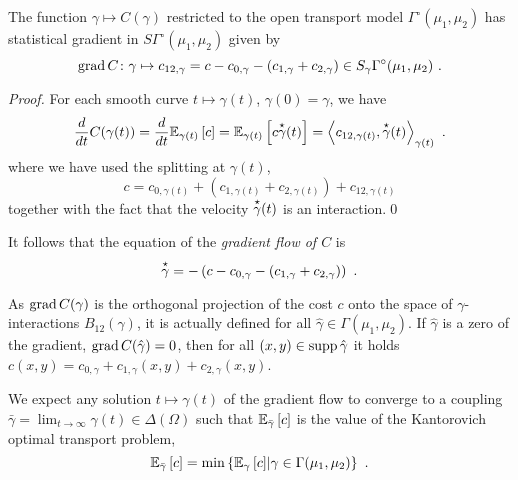 \documentclass[runningheads]{llncs}
\begin{document}
\begin{proposition}The function $\gamma \mapsto C(\gamma)$ restricted to the open transport model $\Gamma^\circ(\mu_1,\mu_2)$ has statistical gradient in $S\Gamma^\circ(\mu_1,\mu_2)$ given by
%
\begin{equation}\label{eq:gradient}
 \grad C \colon \gamma \mapsto c_{12,\gamma} = c - c_{0,\gamma} - (c_{1,\gamma} + c_{2,\gamma}) \in S_\gamma\Gamma^\circ(\mu_1,\mu_2)  \ . 
\end{equation}
\end{proposition}

\begin{proof}
For each smooth curve $t \mapsto \gamma(t)$, $\gamma(0) = \gamma$, we have 
\begin{equation*}
  \derivby t C(\gamma(t)) = \derivby t \expectat {\gamma(t)} c = \expectat {\gamma(t)} {c \velocity \gamma (t)} = \scalarat {\gamma(t)} {c_{12,\gamma(t)}} {\velocity \gamma(t)} \ .
\end{equation*}
where we have used the splitting at $\gamma(t)$,
\begin{equation*}
  c = c_{0,\gamma(t)} + (c_{1,\gamma(t)} + c_{2,\gamma(t)}) + c_{12,\gamma(t)}
\end{equation*}
together with the fact that the velocity $\overset{\star}{\gamma}(t)$ is an interaction.\qed \end{proof}

It follows that the equation of the \emph{gradient flow of $C$} is
%
\begin{equation*}
  \overset{\star}{\gamma} = - \left(c - c_{0,\gamma} - (c_{1,\gamma} + c_{2,\gamma})\right) \ .
\end{equation*}

\begin{remark}
As $\operatorname{grad} C(\gamma)$ is the orthogonal projection of the cost $c$ onto the space of $\gamma$-interactions $B_{12}(\gamma)$, it is actually defined for all $\hat \gamma \in \Gamma(\mu_1,\mu_2)$. If $\hat \gamma$ is a zero of the gradient,
$\operatorname{grad} C(\hat \gamma) = 0$, then for all $(x,y) \in \operatorname{supp}{\hat \gamma}$ it holds $c(x,y) = c_{0,\gamma} + c_{1,\gamma}(x,y) + c_{2,\gamma}(x,y)$.
\end{remark}

We expect any solution $t \mapsto \gamma(t)$ of the gradient flow to converge to a coupling $\bar\gamma = \lim_{t \to \infty} \gamma(t) \in \Delta(\Omega)$ such that ${\operatorname{\mathbb E}}_{\bar\gamma}\left[c\right]$ is the value of the Kantorovich optimal transport problem,
%
\begin{equation*}
  {\operatorname{\mathbb E}}_{\bar\gamma}\left[c\right] = \min \left\{ {\operatorname{\mathbb E}}_{\gamma}\left[c\right] \middle|  \gamma \in \Gamma(\mu_1,\mu_2) \right\} \ .
\end{equation*}
\end{document}
